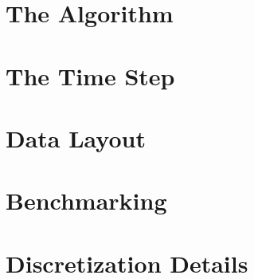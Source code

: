 \documentclass[11pt,a4paper]{article}
\begin{document}
\section{The Algorithm}


\clearpage
\section{The Time Step}



\clearpage
\section{Data Layout}
\label{sec:data}


\section{Benchmarking}

\clearpage
\appendix
\section{Discretization Details}
\label{appendix:discretization}

%
\end{document}
